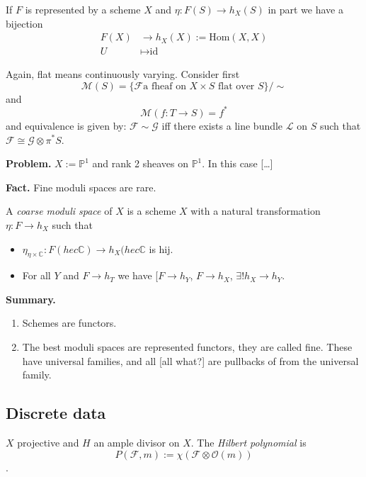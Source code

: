 \begin{definition}
\label{definition-universal-family}
If $F$ is represented by a scheme $X$ and $\eta:F(S)\to h_X(S)$ in part we have
a bijection
\begin{align*}
F(X) &\longrightarrow h_X(X):=\text{Hom}(X,X) \\
U &\longmapsto \text{id}
\end{align*}
\end{definition}

\bigskip\noindent

Again, flat means continuously varying. Consider first
$$
\mathcal{M}(S)=\{\mathcal{F}\text{a fheaf on $X\times S$ flat over }S\}/\sim
$$
and
$$
\mathcal{M}(f:T \to S)=f^*
$$
and equivalence is given by: $\mathcal{F}\sim \mathcal{G}$ iff there exists a
line bundle $\mathcal{L}$ on $S$ such that 
$\mathcal{F}\cong \mathcal{G}\otimes\pi^*S$.

{\bf Problem.} $X:=\mathbb{P}^1$ and rank 2 sheaves on $\mathbb{P}^1$. In this
case […]

{\bf Fact.} Fine moduli spaces are rare.

\begin{definition}
\label{definition-coarse-moduli-space}
A {\it coarse moduli space} of  $X$ is a scheme $X$ with a natural
transformation $\eta:F \to h_X$ such that
\begin{itemize}
\item $\eta_{\eta \times \mathbb{C}}:F(hec \mathbb{C}) \to h_X(hec \mathbb{C}$
is hij.
\item For all $Y$ and $F \to h_T$ we have [$F \to h_Y$, $F\to h_X$, $\exists !
h_X \to h_Y$.
\end{itemize}
\end{definition}

{\bf Summary.}
\begin{enumerate}
\item Schemes are functors.
\item The best moduli spaces are represented functors, they are called fine.
These have universal families, and all [all what?] are pullbacks of from the
universal family.
\end{enumerate}

\subsection*{Discrete data}
\label{subsection-discrete-data}

$X$ projective and $H$ an ample divisor on $X$. The {\it Hilbert polynomial} is
$$
P(\mathcal{F},m):=\chi(\mathcal{F}\otimes \mathcal{O}(m))
$$.

